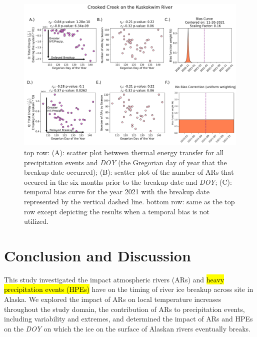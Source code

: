 \documentclass[12pts,draft]{AR_analysis_}
\begin{document}
\begin{figure}[H]
\centering
\includegraphics[width=1.0\textwidth]{./images/concatenated_scatter_bias_plots.png}
	\caption{top row: (A): scatter plot between thermal energy
	transfer for all precipitation events and \emph{DOY} (the Gregorian day of year
	that the breakup date occurred); (B): scatter plot of the number of ARs
	that occured in the six months prior to the breakup date and
	\emph{DOY}; 
	(C): temporal bias curve for the year 2021 with the breakup
	date represented by the vertical dashed line. bottom row: same as
	the top row except depicting the results when a temporal bias
	is not utilized.}
\label{fig:concatenated_corr_plots}
\end{figure}

\section{Conclusion and Discussion}

This study investigated the impact atmospheric rivers (ARs) and \hl{heavy precipitation events
(HPEs)} have on the timing of river ice breakup across site in Alaska. 
We explored the impact of ARs on local temperature increases throughout 
the study domain, the contribution of ARs to precipitation events, 
including variability and extremes, and determined the impact of ARs and HPEs on the \emph{DOY} 
on which the ice on the surface of Alaskan rivers eventually breaks. 
\end{document}
